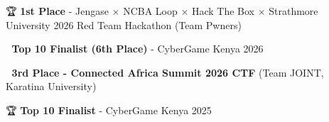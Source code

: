 \documentclass[]{resume-format}
\begin{document}

\vspace{0.5mm}
\begin{cvskills}
\end{cvskills}




\vspace{0.5mm}
\begin{cvachievements}
\setlength{\itemsep}{0mm}
  \item { 🏆 \textbf{1st Place} - Jengase × NCBA Loop × Hack The Box × Strathmore University 2026 Red Team Hackathon (Team Pwners) \href{https://drive.google.com/file/d/1mvwRVQU7Zyclt1lMjO\_QyWrLMDhcRY6G/view?usp=sharing}{\faLink} }
  \item { 🏅 \textbf{Top 10 Finalist (6th Place)} - CyberGame Kenya 2026 \href{https://drive.google.com/file/d/1TnOp-KgKDr4i5hWWWvq6uKJU5GO9brEV/view?usp=sharing}{\faLink} }
  \item { 🥉 \textbf{3rd Place - Connected Africa Summit 2026 CTF} (Team JOINT, Karatina University) \href{https://drive.google.com/file/d/1XTcK8byXo-xYlFFIb6po5rU7VwoUAbl1/view?usp=sharing}{\faLink} }
  \item { 🏆 \textbf{Top 10 Finalist} - CyberGame Kenya 2025 \href{https://www.ict.go.ke/index.php/kenyas-cybergame-2025-awards-recognize-top-cybersecurity-talent}{\faLink} }
\end{cvachievements}


\end{document}
